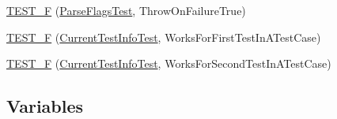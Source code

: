 \begin{DoxyCompactItemize}
\mbox{\hyperlink{namespacetesting_a439e3e79125f5222ddd95b8036252061}{T\+E\+S\+T\+\_\+F}} (\mbox{\hyperlink{classtesting_1_1ParseFlagsTest}{Parse\+Flags\+Test}}, Throw\+On\+Failure\+True)
\item 
\mbox{\hyperlink{namespacetesting_a1e55a3ca18d877e1e83ce0ed9e7b5c79}{T\+E\+S\+T\+\_\+F}} (\mbox{\hyperlink{classtesting_1_1CurrentTestInfoTest}{Current\+Test\+Info\+Test}}, Works\+For\+First\+Test\+In\+A\+Test\+Case)
\item 
\mbox{\hyperlink{namespacetesting_a3775bdbb5d24619425c52103e7ae6434}{T\+E\+S\+T\+\_\+F}} (\mbox{\hyperlink{classtesting_1_1CurrentTestInfoTest}{Current\+Test\+Info\+Test}}, Works\+For\+Second\+Test\+In\+A\+Test\+Case)
\end{DoxyCompactItemize}
\subsection*{Variables}
